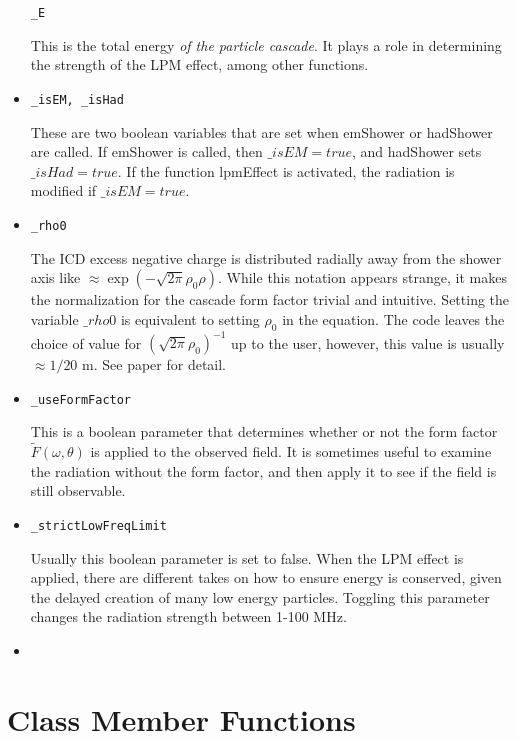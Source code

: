 \documentclass[10pt]{article}
\begin{document}
\begin{itemize}
\begin{verbatim}
_E
\end{verbatim}
This is the total energy \textit{of the particle cascade}.  It plays a role in determining the strength of the LPM effect, among other functions.
\item \begin{verbatim}
_isEM, _isHad
\end{verbatim}
These are two boolean variables that are set when emShower or hadShower are called.  If emShower is called, then $\_isEM = true$, and hadShower sets $\_isHad = true$.  If the function lpmEffect is activated, the radiation is modified if $\_isEM = true$.
\item \begin{verbatim}
_rho0
\end{verbatim}
The ICD excess negative charge is distributed radially away from the shower axis like $\approx \exp(-\sqrt{2\pi}\rho_0 \rho)$.  While this notation appears strange, it makes the normalization for the cascade form factor trivial and intuitive.  Setting the variable $\_rho0$ is equivalent to setting $\rho_0$ in the equation.  The code leaves the choice of value for $(\sqrt{2\pi} \rho_0)^{-1}$ up to the user, however, this value is usually $\approx 1/20$ m.  See paper for detail.
\item \begin{verbatim}
_useFormFactor
\end{verbatim}
This is a boolean parameter that determines whether or not the form factor $\widetilde{F}(\omega,\theta)$ is applied to the observed field.  It is sometimes useful to examine the radiation without the form factor, and then apply it to see if the field is still observable.
\item \begin{verbatim}
_strictLowFreqLimit
\end{verbatim}
Usually this boolean parameter is set to false.  When the LPM effect is applied, there are different takes on how to ensure energy is conserved, given the delayed creation of many low energy particles.  Toggling this parameter changes the radiation strength between 1-100 MHz.
\item \begin{verbatim}
\end{verbatim}
\end{itemize}

\section{Class Member Functions}
\end{document}
